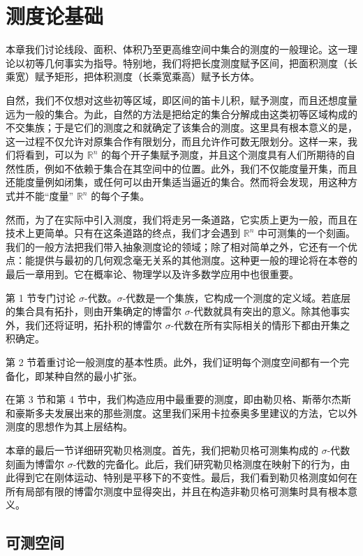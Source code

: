 \chapter{测度论基础}
本章我们讨论线段、面积、体积乃至更高维空间中集合的测度的一般理论。这一理论以初等几何事实为指导。特别地，我们将把长度测度赋予区间，把面积测度（长乘宽）赋予矩形，把体积测度（长乘宽乘高）赋予长方体。

自然，我们不仅想对这些初等区域，即区间的笛卡儿积，赋予测度，而且还想度量远为一般的集合。为此，自然的方法是把给定的集合分解成由这类初等区域构成的不交集族；于是它们的测度之和就确定了该集合的测度。这里具有根本意义的是，这一过程不仅允许对原集合作有限划分，而且允许作可数无限划分。这样一来，我们将看到，可以为 $ \mathbb{R}^n $ 的每个开子集赋予测度，并且这个测度具有人们所期待的自然性质，例如不依赖于集合在其空间中的位置。此外，我们不仅能度量开集，而且还能度量例如闭集，或任何可以由开集适当逼近的集合。然而将会发现，用这种方式并不能“度量” $ \mathbb{R}^n $ 的每个子集。

然而，为了在实际中引入测度，我们将走另一条道路，它实质上更为一般，而且在技术上更简单。只有在这条道路的终点，我们才会遇到 $ \mathbb{R}^n $ 中可测集的一个刻画。我们的一般方法把我们带入抽象测度论的领域；除了相对简单之外，它还有一个优点：能提供与最初的几何观念毫无关系的其他测度。这种更一般的理论将在本卷的最后一章用到。它在概率论、物理学以及许多数学应用中也很重要。

第 1 节专门讨论 $ \sigma $-代数。$ \sigma $-代数是一个集族，它构成一个测度的定义域。若底层的集合具有拓扑，则由开集确定的博雷尔 $ \sigma $-代数就具有突出的意义。除其他事实外，我们还将证明，拓扑积的博雷尔 $ \sigma $-代数在所有实际相关的情形下都由开集之积确定。

第 2 节着重讨论一般测度的基本性质。此外，我们证明每个测度空间都有一个完备化，即某种自然的最小扩张。

在第 3 节和第 4 节中，我们构造应用中最重要的测度，即由勒贝格、斯蒂尔杰斯和豪斯多夫发展出来的那些测度。这里我们采用卡拉泰奥多里建议的方法，它以外测度的思想作为其上层结构。

本章的最后一节详细研究勒贝格测度。首先，我们把勒贝格可测集构成的 $ \sigma $-代数刻画为博雷尔 $ \sigma $-代数的完备化。此后，我们研究勒贝格测度在映射下的行为，由此得到它在刚体运动、特别是平移下的不变性。最后，我们看到勒贝格测度如何在所有局部有限的博雷尔测度中显得突出，并且在构造非勒贝格可测集时具有根本意义。

\section{可测空间}

